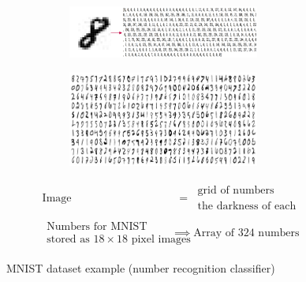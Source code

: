 \begin{figure}[H]
  \centering
  \begin{subfigure}{\textwidth}
    \centering
    \begin{subfigure}{0.57\textwidth}
      \includegraphics[width=0.9\textwidth]{assets/nn/in__mnist_feature.png}
    \end{subfigure}
    \begin{subfigure}{0.33\textwidth}
      \includegraphics[width=0.9\textwidth]{assets/nn/in__mnist_dataset.png}
    \end{subfigure}
  \end{subfigure}

  \vspace*{0.2cm}
  \begin{subfigure}{\textwidth}
    \centering
    \begin{align*}
    \text{Image} &\ \ =\ \begin{array}{l}\text{grid of numbers representing}\\\text{the darkness of each pixel (grayscale)}\end{array}\\
    \begin{array}{r}\text{Numbers for MNIST are}\\\text{stored as }18\times18\text{ pixel images}\end{array} &\implies \text{Array of }324\text{ numbers}
    \end{align*}
  \end{subfigure}

  \caption{MNIST dataset example (number recognition classifier)}
  \label{fig:6_intro_mnist}
\end{figure}

